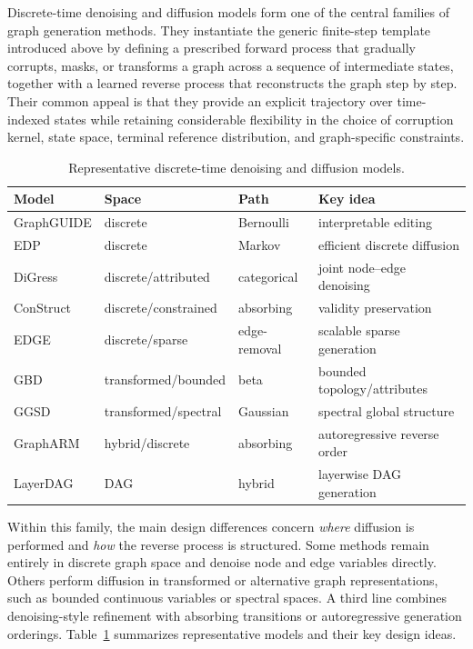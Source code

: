\documentclass{article}
\begin{document}
Discrete-time denoising and diffusion models form one of the central families of graph generation methods. They instantiate the generic finite-step template introduced above by defining a prescribed forward process that gradually corrupts, masks, or transforms a graph across a sequence of intermediate states, together with a learned reverse process that reconstructs the graph step by step. Their common appeal is that they provide an explicit trajectory over time-indexed states while retaining considerable flexibility in the choice of corruption kernel, state space, terminal reference distribution, and graph-specific constraints.

\begin{table}[H]
\centering
\footnotesize
\renewcommand{\arraystretch}{1.12}
\setlength{\tabcolsep}{3pt}
\begin{tabularx}{\columnwidth}{@{}>{\raggedright\arraybackslash}p{2.0cm}
                                >{\raggedright\arraybackslash}p{3.0cm}
                                >{\raggedright\arraybackslash}p{2.0cm}
                                X@{}}
\toprule
\textbf{Model} & \textbf{Space} & \textbf{Path} & \textbf{Key idea} \\
\midrule
GraphGUIDE & discrete & Bernoulli & interpretable editing \\
EDP        & discrete & Markov & efficient discrete diffusion \\
DiGress    & discrete/attributed & categorical & joint node--edge denoising \\
ConStruct  & discrete/constrained & absorbing & validity preservation \\
EDGE       & discrete/sparse & edge-removal & scalable sparse generation \\
GBD        & transformed/bounded & beta & bounded topology/attributes \\
GGSD       & transformed/spectral & Gaussian & spectral global structure \\
GraphARM   & hybrid/discrete & absorbing & autoregressive reverse order \\
LayerDAG   & DAG & hybrid & layerwise DAG generation \\
\bottomrule
\end{tabularx}
\caption{Representative discrete-time denoising and diffusion models.}
\label{tab:discrete_diffusion_keyword}
\end{table}

Within this family, the main design differences concern \emph{where} diffusion is performed and \emph{how} the reverse process is structured. Some methods remain entirely in discrete graph space and denoise node and edge variables directly. Others perform diffusion in transformed or alternative graph representations, such as bounded continuous variables or spectral spaces. A third line combines denoising-style refinement with absorbing transitions or autoregressive generation orderings. Table~\ref{tab:discrete_diffusion_keyword} summarizes representative models and their key design ideas.
\end{document}
